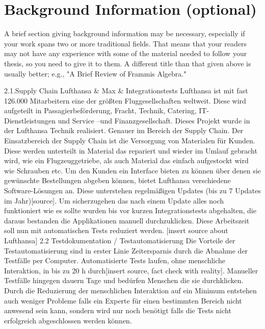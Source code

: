 \chapter{Background Information (optional)}
\label{sec:BackgroundInformation}

A brief section giving background information may be necessary, especially if
your work spans two or more traditional fields. That means that your readers may
not have any experience with some of the material needed to follow your thesis,
so you need to give it to them. A different title than that given above is
usually better; e.g., "A Brief Review of Frammis Algebra."

2.1.Supply Chain Lufthansa & Max & Integrationstests
Lufthansa ist mit fast 126.000 Mitarbeitern eine der größten Fluggesellschaften weltweit. Diese wird aufgeteilt in Passagierbeförderung, Fracht, Technik, Catering, IT- Dienstleistungen und Service –und Finanzgesellschaft. Dieses Projekt wurde in der Lufthansa Technik realisiert. Genauer im Bereich der Supply Chain. Der Einsatzbereich der Supply Chain ist die Versorgung von Materialen für Kunden. Diese werden unterteilt in Material das repariert und wieder im Umlauf gebracht wird, wie ein Flugzeuggetriebe, als auch Material das einfach aufgestockt wird wie Schrauben etc.
Um den Kunden ein Interface bieten zu können über denen sie gewünschte Bestellungen abgeben können, bietet Lufthansa verschiedene Software-Lösungen an. Diese unterstehen regelmäßigen Updates (bis zu 7 Updates im Jahr)[source]. Um sicherzugehen das nach einem Update alles noch funktioniert wie es sollte wurden bis vor kurzen Integrationstests abgehalten, die daraus bestanden die Applikationen manuell durchzuklicken. Diese Arbeitszeit soll nun mit automatischen Tests reduziert  werden. [insert source about Lufthansa]
2.2 Testdokumentation  / Testautomatisierung 
Die Vorteile der Testautomatisierung sind in erster Linie Zeitersparnis durch die Abnahme der Testfälle per Computer. Automatisierte Tests laufen, ohne menschliche Interaktion,  in bis zu 20 h durch[insert source, fact check with reality]. Manueller Testfälle hingegen dauern Tage und bedürfen Menschen die sie durchklicken. Durch die Reduzierung der menschlichen Interaktion auf ein Minimum entstehen auch weniger Probleme falls ein Experte für einen bestimmten Bereich nicht anwesend sein kann, sondern wird nur noch benötigt falls die Tests nicht erfolgreich abgeschlossen werden können. 

